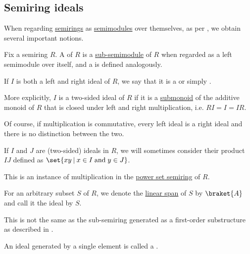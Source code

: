 \subsection{Semiring ideals}\label{subsec:semiring_ideals}

When regarding \hyperref[def:semiring]{semirings} as \hyperref[def:semimodule]{semimodules} over themselves, as per , we obtain several important notions.

\begin{definition}\label{def:semiring_ideal}\mimprovised
  Fix a semiring \( R \). A  of \( R \) is a \hyperref[def:semimodule/submodel]{sub-semimodule} of \( R \) when regarded as a left semimodule over itself, and a  is defined analogously.

  If \( I \) is both a left and right ideal of \( R \), we say that it is a  or simply .

  More explicitly, \( I \) is a two-sided ideal of \( R \) if it is a \hyperref[def:monoid/submodel]{submonoid} of the additive monoid of \( R \) that is closed under left and right multiplication, i.e. \( RI = I = IR \).

  Of course, if multiplication is commutative, every left ideal is a right ideal and there is no distinction between the two.

  \begin{thmenum}
     If \( I \) and \( J \) are (two-sided) ideals in \( R \), we will sometimes consider their product \( IJ \) defined as \( \set{ xy \given x \in I \T{and} y \in J } \).

    This is an instance of multiplication in the \hyperref[def:semiring/power_set]{power set semiring} of \( R \).

     For an arbitrary subset \( S \) of \( R \), we denote the \hyperref[def:semimodule/submodel]{linear span} of \( S \) by \( \braket{ A } \) and call it the ideal  by \( S \).

    This is not the same as the sub-semiring generated as a first-order substructure as described in .

     An ideal generated by a single element is called a .
  \end{thmenum}
\end{definition}

